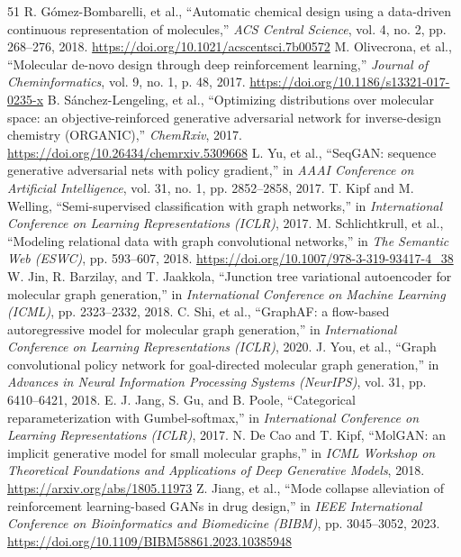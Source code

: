 \documentclass[10pt,a4paper]{article}
\begin{document}
\begin{thebibliography}{51}
 R. G\'omez-Bombarelli, et al., ``Automatic chemical design using a data-driven continuous representation of molecules,'' \textit{ACS Central Science}, vol. 4, no. 2, pp. 268--276, 2018. \url{https://doi.org/10.1021/acscentsci.7b00572}
 M. Olivecrona, et al., ``Molecular de-novo design through deep reinforcement learning,'' \textit{Journal of Cheminformatics}, vol. 9, no. 1, p. 48, 2017. \url{https://doi.org/10.1186/s13321-017-0235-x}
 B. S\'anchez-Lengeling, et al., ``Optimizing distributions over molecular space: an objective-reinforced generative adversarial network for inverse-design chemistry (ORGANIC),'' \textit{ChemRxiv}, 2017. \url{https://doi.org/10.26434/chemrxiv.5309668}
 L. Yu, et al., ``SeqGAN: sequence generative adversarial nets with policy gradient,'' in \textit{AAAI Conference on Artificial Intelligence}, vol. 31, no. 1, pp. 2852--2858, 2017.
 T. Kipf and M. Welling, ``Semi-supervised classification with graph networks,'' in \textit{International Conference on Learning Representations (ICLR)}, 2017.
 M. Schlichtkrull, et al., ``Modeling relational data with graph convolutional networks,'' in \textit{The Semantic Web (ESWC)}, pp. 593--607, 2018. \url{https://doi.org/10.1007/978-3-319-93417-4_38}
 W. Jin, R. Barzilay, and T. Jaakkola, ``Junction tree variational autoencoder for molecular graph generation,'' in \textit{International Conference on Machine Learning (ICML)}, pp. 2323--2332, 2018.
 C. Shi, et al., ``GraphAF: a flow-based autoregressive model for molecular graph generation,'' in \textit{International Conference on Learning Representations (ICLR)}, 2020.
 J. You, et al., ``Graph convolutional policy network for goal-directed molecular graph generation,'' in \textit{Advances in Neural Information Processing Systems (NeurIPS)}, vol. 31, pp. 6410--6421, 2018.
 E. J. Jang, S. Gu, and B. Poole, ``Categorical reparameterization with Gumbel-softmax,'' in \textit{International Conference on Learning Representations (ICLR)}, 2017.
 N. De Cao and T. Kipf, ``MolGAN: an implicit generative model for small molecular graphs,'' in \textit{ICML Workshop on Theoretical Foundations and Applications of Deep Generative Models}, 2018. \url{https://arxiv.org/abs/1805.11973}
 Z. Jiang, et al., ``Mode collapse alleviation of reinforcement learning-based GANs in drug design,'' in \textit{IEEE International Conference on Bioinformatics and Biomedicine (BIBM)}, pp. 3045--3052, 2023. \url{https://doi.org/10.1109/BIBM58861.2023.10385948}

\end{thebibliography}
\end{document}
